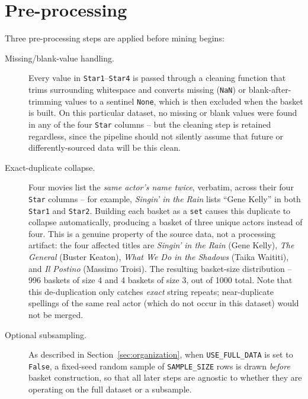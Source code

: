 \documentclass[11pt,a4paper]{article}
\begin{document}
\section{Pre-processing}
\label{sec:preprocessing}

Three pre-processing steps are applied before mining begins:

\begin{description}
    \item[Missing/blank-value handling.] Every value in \texttt{Star1}--\texttt{Star4}
    is passed through a cleaning function that trims surrounding whitespace and
    converts missing (\texttt{NaN}) or blank-after-trimming values to a
    sentinel \texttt{None}, which is then excluded when the basket is built.
    On this particular dataset, no missing or blank values were found in any
    of the four \texttt{Star} columns -- but the cleaning step is retained
    regardless, since the pipeline should not silently assume that future or
    differently-sourced data will be this clean.

    \item[Exact-duplicate collapse.] Four movies list the \emph{same actor's
    name twice}, verbatim, across their four \texttt{Star} columns -- for
    example, \emph{Singin' in the Rain} lists ``Gene Kelly'' in both
    \texttt{Star1} and \texttt{Star2}. Building each basket as a \texttt{set} causes this duplicate to collapse
    automatically, producing a basket of three unique actors instead of four.
    This is a genuine property of the source data, not a processing artifact:
    the four affected titles are \emph{Singin' in the Rain} (Gene Kelly),
    \emph{The General} (Buster Keaton), \emph{What We Do in the Shadows}
    (Taika Waititi), and \emph{Il Postino} (Massimo Troisi). The resulting
    basket-size distribution -- 996 baskets of size 4 and 4 baskets of size 3,
    out of 1000 total. Note that this de-duplication only catches \emph{exact} string repeats; near-duplicate
    spellings of the same real actor (which do not occur in this dataset) would
    not be merged.

    \item[Optional subsampling.] As described in
    Section~\ref{sec:organization}, when \texttt{USE\_FULL\_DATA} is set to
    \texttt{False}, a fixed-seed random sample of \texttt{SAMPLE\_SIZE} rows is
    drawn \emph{before} basket construction, so that all later steps are
    agnostic to whether they are operating on the full dataset or a subsample.
\end{description}
\end{document}
